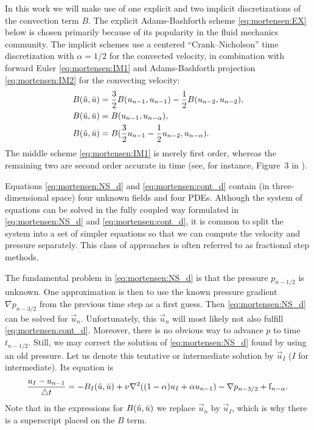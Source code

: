 In this work we will make use of one explicit and two implicit
discretizations of the convection term $B$.  The explicit
Adams-Bashforth scheme \eqref{eq:mortensen:EX} below is chosen
primarily because of its popularity in the fluid mechanics
community. The implicit schemes use a centered ``Crank--Nicholson''
time discretization with $\alpha=1/2$ for the convected velocity, in
combination with forward Euler \eqref{eq:mortensen:IM1} and
Adams-Bashforth projection \eqref{eq:mortensen:IM2} for the convecting
velocity:
\begin{align}
\label{eq:mortensen:EX}
B(\tilde{\vec{u}},\Bar{\vec{u}}) &=
\frac{3}{2}B(\vec{u}_{n-1},\vec{u}_{n-1})-
\frac{1}{2}B(\vec{u}_{n-2},\vec{u}_{n-2}),
\\
\label{eq:mortensen:IM1}
B(\tilde{\vec{u}},\Bar{\vec{u}}) &=
B(\vec{u}_{n-1},\vec{u}_{n-\alpha}),
\\
 \label{eq:mortensen:IM2}
B(\tilde{\vec{u}},\Bar{\vec{u}}) &=
B(\frac{3}{2}\vec{u}_{n-1}-\frac{1}{2}\vec{u}_{n-2},\vec{u}_{n-\alpha}).
\end{align}
The middle scheme \eqref{eq:mortensen:IM1} is merely first order,
whereas the remaining two are second order accurate in time (see, for
instance, Figure~3 in \citet{SimoArmero1994}).

Equations \eqref{eq:mortensen:NS_d} and \eqref{eq:mortensen:cont_d}
contain (in three-dimensional space) four unknown fields and four
PDEs.  Although the system of equations can be solved in the fully
coupled way formulated in \eqref{eq:mortensen:NS_d} and
\eqref{eq:mortensen:cont_d}, it is common to split the system into a
set of simpler equations so that we can compute the velocity and
pressure separately.  This class of approaches is often referred to as
fractional step methods.

The fundamental problem in \eqref{eq:mortensen:NS_d} is that the
pressure $p_{n-1/2}$ is unknown. One approximation is then to use the
known pressure gradient $\nabla p_{n-3/2}$ from the previous time step
as a first guess. Then \eqref{eq:mortensen:NS_d} can be solved for
$\vec{u}_n$. Unfortunately, this $\vec{u}_n$ will most likely not also
fulfill \eqref{eq:mortensen:cont_d}. Moreover, there is no obvious way
to advance $p$ to time $t_{n-1/2}$. Still, we may correct the solution
of \eqref{eq:mortensen:NS_d} found by using an old pressure. Let us
denote this tentative or intermediate solution by $\vec{u}_I$ ($I$ for
intermediate). Its equation is
\begin{equation}
\label{eq:mortensen:NS_FS}
\frac{{\vec{u}}_{I}-\vec{u}_{n-1}}{\triangle t} =
- B_I(\tilde{\vec{u}},\Bar{\vec{u}}) +
\nu \nabla^2 ((1-\alpha) {\vec{u}}_{I} + \alpha \vec{u}_{n-1})
-\nabla p_{n-3/2} + \text{f}_{n-\alpha} . \thinspace
\end{equation}
Note that in the expressions for
$B(\tilde{\vec{u}},\Bar{\vec{u}})$ we replace $\vec{u}_n$ by
$\vec{u}_I$, which is why there is a superscript placed on the $B$
term.


